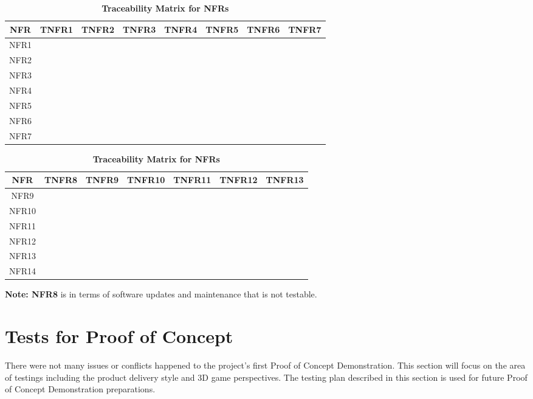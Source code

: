 \documentclass[12pt, titlepage]{article}
\begin{document}
    \begin{table}[!htb]
        \begin{threeparttable}
    		\begin{tabular}{|c|ccccccc|}
        		\hline
        		\textbf{NFR}&TNFR1&TNFR2&TNFR3&TNFR4&TNFR5&TNFR6&TNFR7\\
        		\hline
        		NFR1&\checkmark&&&&&&\\
        		NFR2&&\checkmark&&&&&\\
        		NFR3&&&\checkmark&&&&\\
        		NFR4&&&&\checkmark&&&\\
        		NFR5&&&&&\checkmark&&\\
        		NFR6&&&&&&\checkmark&\\
        		NFR7&&&&&&&\checkmark\\

        		\hline
    		\end{tabular}
 		\begin{tabular}{|c|cccccc|}
    		\hline
    		\textbf{NFR}&TNFR8&TNFR9&TNFR10&TNFR11&TNFR12&TNFR13\\
    		\hline
        	NFR9&\checkmark&&&&&\\
    		NFR10&&\checkmark&&&&\\
    		NFR11&&&\checkmark&&&\\
    		NFR12&&&&\checkmark&&\\
    		NFR13&&&&&\checkmark&\\
    		NFR14&&&&&&\checkmark\\

    		\hline
    		\end{tabular}
    				    \begin{tablenotes}
            \item \textbf{Note: NFR8} is in terms of software updates and maintenance that is not testable.

            \end{tablenotes}
    		\caption{\bf Traceability Matrix for NFRs}

        \end{threeparttable}
    \end{table}

    \FloatBarrier
\section{Tests for Proof of Concept}
There were not many issues or conflicts happened to the project's first Proof of Concept Demonstration. This section will focus on the area of testings including the product delivery style and 3D game perspectives. The testing plan described in this section is used for future Proof of Concept Demonstration preparations.
\end{document}
